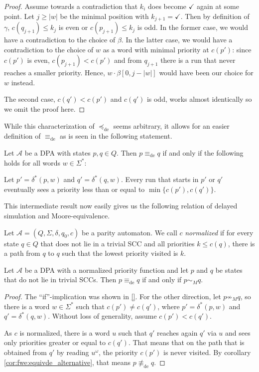 \begin{proof}
	Assume towards a contradiction that $k_i$ does become $\checkmark$ again at some point. Let $j \geq |w|$ be the minimal position with $k_{j+1} = \checkmark$. Then by definition of $\gamma$, $c(q_{j+1}) \leq k_j$ is even or $c(p_{j+1}) \leq k_j$ is odd. In the former case, we would have a contradiction to the choice of $\beta$. In the latter case, we would have a contradiction to the choice of $w$ as a word with minimal priority at $c(p')$: since $c(p')$ is even, $c(p_{j+1}) < c(p')$ and from $q_{j+1}$ there is a run that never reaches a smaller priority. Hence, $w \cdot \beta[0, j-|w|]$ would have been our choice for $w$ instead.
	
	The second case, $c(q') < c(p')$ and $c(q')$ is odd, works almost identically so we omit the proof here.
\end{proof}

While this characterization of $\preceq_\text{de}$ seems arbitrary, it allows for an easier definition of $\equiv_\text{de}$ as is seen in the following statement.

\begin{cor}
\label{cor:fwe:equivde_alternative}
	Let $\mathcal{A}$ be a DPA with states $p, q \in Q$. Then $p \equiv_\text{de} q$ if and only if the following holds for all words $w \in \Sigma^*$:
	
	Let $p' = \delta^*(p, w)$ and $q' = \delta^*(q, w)$. Every run that starts in $p'$ or $q'$ eventually sees a priority less than or equal to $\min \{c(p'), c(q')\}$.
\end{cor}

This intermediate result now easily gives us the following relation of delayed simulation and Moore-equivalence.

\begin{defn}
	Let $\mathcal{A} = (Q, \Sigma, \delta, q_0, c)$ be a parity automaton. We call $c$ \emph{normalized} if for every state $q \in Q$ that does not lie in a trivial SCC and all priorities $k \leq c(q)$, there is a path from $q$ to $q$ such that the lowest priority visited is $k$.
\end{defn}

\begin{lem}
	Let $\mathcal{A}$ be a DPA with a normalized priority function and let $p$ and $q$ be states that do not lie in trivial SCCs. Then $p \equiv_\text{de} q$ if and only if $p \sim_M q$.
\end{lem}

\begin{proof}
	The \enquote{if}-implication was shown in \ref{}. For the other direction, let $p \not\sim_M q$, so there is a word $w \in \Sigma^*$ such that $c(p') \neq c(q')$, where $p' = \delta^*(p, w)$ and $q' = \delta^*(q, w)$. Without loss of generality, assume $c(p') < c(q')$.
	
	As $c$ is normalized, there is a word $u$ such that $q'$ reaches again $q'$ via $u$ and sees only priorities greater or equal to $c(q')$. That means that on the path that is obtained from $q'$ by reading $u^\omega$, the priority $c(p')$ is never visited. By corollary \ref{cor:fwe:equivde_alternative}, that means $p \not\equiv_\text{de} q$.
\end{proof}

